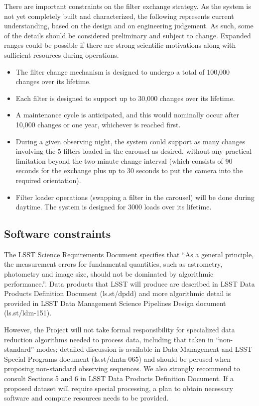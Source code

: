 \documentclass[DM,lsstdraft,toc,usenatbib]{lsstdoc}
\begin{document}
There are important constraints on the filter exchange strategy. As the system is not yet completely 
built and characterized, the following represents current understanding, based on the design and on 
engineering judgement. As such, some of the details should be considered preliminary and subject 
to change. Expanded ranges could be possible if there are strong scientific motivations along with
sufficient resources during operations.
\begin{itemize}
\item The filter change mechanism is designed to undergo a total of 100,000 changes over its lifetime. 
\item Each filter is designed to support up to 30,000 changes over its lifetime.
\item A maintenance cycle is anticipated, and this would nominally occur after 10,000 changes or 
          one year, whichever is reached first. 
\item During a given observing night, the system could support as many changes involving the 5 filters 
          loaded in the carousel as desired, without any practical limitation beyond the two-minute change 
          interval (which consists of 90 seconds for the exchange plus up to 30 seconds to put the camera
          into the required orientation). 
\item Filter loader operations (swapping a filter in the carousel) will be done during daytime. The system 
          is designed for 3000 loads over its lifetime. 
\end{itemize} 


\subsection{Software constraints} 

The LSST Science Requirements Document specifies that ``As a general principle, the measurement errors
for fundamental quantities, such as astrometry, photometry and image size, should not be dominated by 
algorithmic performance.''. Data products that LSST will produce are described in LSST Data Products
Definition Document (ls.st/dpdd) and more algorithmic detail is provided in LSST Data Management 
Science Pipelines Design document (ls.st/ldm-151). 

However, the Project will not take formal responsibility for specialized data reduction algorithms 
needed to process data, including that taken in ``non-standard'' modes; detailed discussion is 
available in Data Management and LSST Special Programs document (ls.st/dmtn-065) and should
be perused when proposing non-standard observing sequences. We also strongly recommend to 
consult Sections 5 and 6 in LSST Data Products Definition Document. If a proposed dataset will 
require special processing, a plan to obtain necessary software and compute resources needs to be 
provided. 
\end{document}
